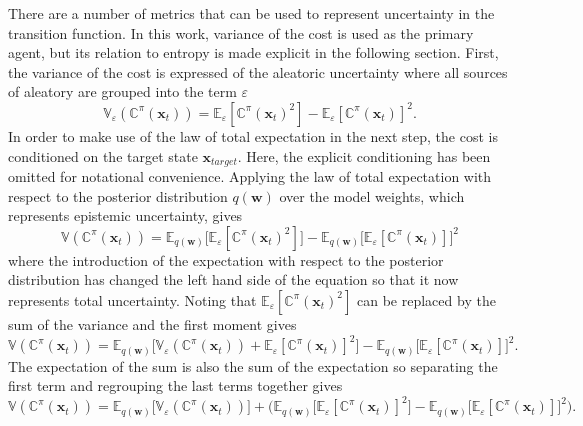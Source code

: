There are a number of metrics that can be used to represent uncertainty in the transition function. In this work, variance of the cost is used as the primary agent, but its relation to entropy is made explicit in the following section. First, the variance of the cost is expressed of the aleatoric uncertainty where all sources of aleatory are grouped into the term  $\varepsilon$
\begin{equation}
    \mathbb{V}_{\varepsilon}\left(\mathbb{C}^{\pi}\left(\mathbf{x}_{t}\right)\right)=\mathbb{E}_{\varepsilon}\left[\mathbb{C}^{\pi}(\mathbf{x}_{t})^{2}\right] - \mathbb{E}_{\varepsilon}\left[\mathbb{C}^{\pi}(\mathbf{x}_{t})\right]^{2}.
\end{equation}
In order to make use of the law of total expectation in the next step, the cost is conditioned on the target state $\mathbf{x}_{target}$. Here, the explicit conditioning has been omitted for notational convenience. Applying the law of total expectation with respect to the posterior distribution $q(\mathbf{w})$ over the model weights, which represents epistemic uncertainty, gives
\begin{equation}
    \mathbb{V}\left(\mathbb{C}^{\pi}\left(\mathbf{x}_{t}\right)\right)=\mathbb{E}_{q(\mathbf{w})}\big[\mathbb{E}_{\varepsilon}\left[\mathbb{C}^{\pi}(\mathbf{x}_{t})^{2}\right]\big] - \mathbb{E}_{q(\mathbf{w})}\big[\mathbb{E}_{\varepsilon}\left[\mathbb{C}^{\pi}(\mathbf{x}_{t})\right]\big]^{2}
\end{equation}
where the introduction of the expectation with respect to the posterior distribution has changed the left hand side of the equation so  that it now represents total uncertainty. Noting that $\mathbb{E}_{\varepsilon}\left[\mathbb{C}^{\pi}(\mathbf{x}_{t})^{2}\right]$ can be replaced by the sum of the variance and the first moment gives
\begin{equation}
    \mathbb{V}\left(\mathbb{C}^{\pi}\left(\mathbf{x}_{t}\right)\right)=\mathbb{E}_{q(\mathbf{w})}\big[\mathbb{V}_{\varepsilon}\left(\mathbb{C}^{\pi}(\mathbf{x}_{t})\right)+\mathbb{E}_{\varepsilon}\left[\mathbb{C}^{\pi}(\mathbf{x}_{t})\right]^{2}\big] - \mathbb{E}_{q(\mathbf{w})}\big[\mathbb{E}_{\varepsilon}\left[\mathbb{C}^{\pi}(\mathbf{x}_{t})\right]\big]^{2}.
\end{equation}
The expectation of the sum is also the sum of the expectation so separating the first term and regrouping the last terms together gives
\begin{equation}
    \mathbb{V}\left(\mathbb{C}^{\pi}\left(\mathbf{x}_{t}\right)\right)=\mathbb{E}_{q(\mathbf{w})}\big[\mathbb{V}_{\varepsilon}\left(\mathbb{C}^{\pi}(\mathbf{x}_{t})\right)\big] + \bigg(\mathbb{E}_{q(\mathbf{w})}\big[\mathbb{E}_{\varepsilon}\left[\mathbb{C}^{\pi}(\mathbf{x}_{t})\right]^{2}\big]- \mathbb{E}_{q(\mathbf{w})}\big[\mathbb{E}_{\varepsilon}\left[\mathbb{C}^{\pi}(\mathbf{x}_{t})\right]\big]^{2}\bigg).
\end{equation}
